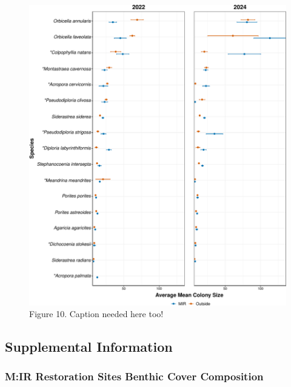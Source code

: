 \documentclass[
]{article}
\begin{document}
\begin{figure}

{\centering \includegraphics{MIR_quarto_files/figure-pdf/overall Max_Dim-1.pdf}

}

\caption{Figure 10. Caption needed here too!}

\end{figure}

\hypertarget{supplemental-information}{%
\subsection{\texorpdfstring{\textbf{Supplemental
Information}}{Supplemental Information}}\label{supplemental-information}}

\hypertarget{mir-restoration-sites-benthic-cover-composition}{%
\subsubsection{M:IR Restoration Sites Benthic Cover
Composition}\label{mir-restoration-sites-benthic-cover-composition}}
\end{document}
